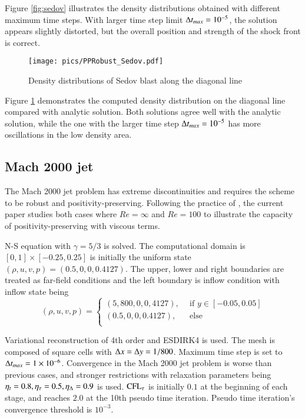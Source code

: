 \documentclass[preprint,12pt]{elsarticle}
\begin{document}
Figure \ref{fig:sedov} illustrates the density distributions
obtained with different maximum time steps. 
With larger time step limit $\mathrm\Delta t_{max}=10^{-5}$, the 
solution appears slightly distorted, but the overall 
position and strength of the shock front is correct.

\begin{figure}[htbp]
    \centering
    \texttt{[image: pics/PPRobust\_Sedov.pdf]}
    \caption{Density distributions of Sedov blast along the diagonal line}
    \label{fig:sedovLine}
\end{figure}

Figure \ref{fig:sedovLine} demonstrates the computed  
density distribution on the diagonal line compared with analytic solution.
Both solutions agree well with the analytic solution,
while the one with the larger time step $\mathrm\Delta t_{max}=10^{-5}$
has more oscillations in the low density area.




\subsection{Mach 2000 jet}

The Mach 2000 jet problem \cite{zhang2010positivity}
has extreme discontinuities and requires the 
scheme to be robust and positivity-preserving.
Following the practice of \cite{huang2024general}, 
the current paper studies both  cases where 
$Re=\infty$ and $Re=100$ to illustrate 
the capacity of positivity-preserving with viscous terms.

N-S equation with $\gamma=5/3$ is solved.
The computational domain is $[0,1]\times[-0.25,0.25]$ is initially the 
uniform state $(\rho,u,v,p)=(0.5,0,0,0.4127)$.
The upper, lower and right boundaries are treated as 
far-field conditions and the left boundary is inflow
condition with inflow state being 
\begin{equation}
    (\rho,u,v,p) = \left\{
        \begin{array}{ll}
            (5,800,0,0,4127),\ \ & \text{if } y\in[-0.05,0.05] \\
            (0.5,0,0,0.4127),\ \ & \text{else}\\
        \end{array}
    \right.
\end{equation}

Variational reconstruction of 4th order and ESDIRK4 is used.
The mesh is composed of square cells with $\mathrm\Delta x = \mathrm\Delta y = 1/800$.
Maximum time step is set to $\mathrm\Delta t_{max} = 1\times10^{-6}$. 
Convergence in the Mach 2000 jet problem is worse than
previous cases, and stronger restrictions with relaxation 
parameters being 
$\eta_t= 0.8, \eta_\tau=0.5, \eta_\mathrm\Delta=0.9$ is used.
$\text{CFL}_\tau$ is initially $0.1$ at the beginning of each stage,
and reaches $2.0$ at the 10th pseudo time iteration. 
Pseudo time iteration's convergence threshold is $10^{-3}$. 
\end{document}
